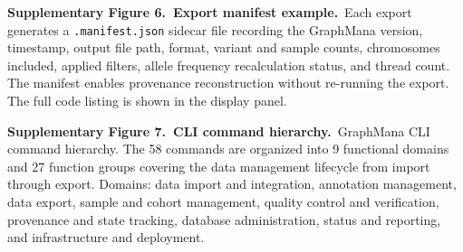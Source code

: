\documentclass[11pt,a4paper]{article}
\begin{document}
\vspace{0.8em}

\noindent\textbf{Supplementary Figure 6.~Export manifest example.}~Each export generates a \texttt{.manifest.json} sidecar file recording the GraphMana version, timestamp, output file path, format, variant and sample counts, chromosomes included, applied filters, allele frequency recalculation status, and thread count. The manifest enables provenance reconstruction without re-running the export. The full code listing is shown in the display panel.

\vspace{0.8em}

\noindent\textbf{Supplementary Figure 7.~CLI command hierarchy.}~GraphMana CLI command hierarchy. The 58 commands are organized into 9 functional domains and 27 function groups covering the data management lifecycle from import through export. Domains: data import and integration, annotation management, data export, sample and cohort management, quality control and verification, provenance and state tracking, database administration, status and reporting, and infrastructure and deployment.

\vspace{0.8em}
\end{document}
